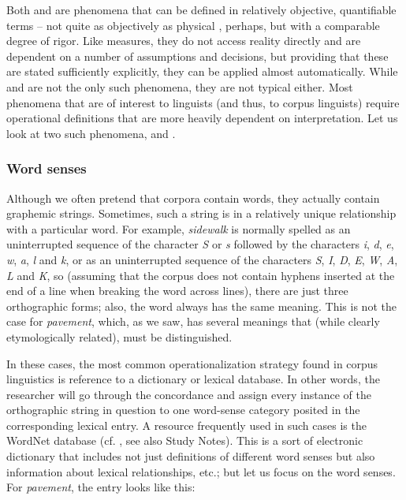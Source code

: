 Both   and  are phenomena that can be defined in relatively objective, quantifiable  terms -- not quite as objectively as physical , perhaps, but with a comparable degree of rigor. Like  measures,  they do not access reality directly and are dependent on a number of assumptions and decisions, but providing that these are stated sufficiently explicitly, they can be applied almost automatically. While   and  are not the only such phenomena, they are not typical either. Most phenomena that are of interest to linguists (and thus, to corpus linguists) require operational  definitions that are more heavily dependent on interpretation. Let us look at two such phenomena,  and  .

\subsubsection{Word senses}
\label{sec:operationalizingwordsenses}

Although we often pretend that corpora contain words, they actually contain graphemic strings. Sometimes, such a string is in a relatively unique relationship with a particular word. For example, \textit{sidewalk} is normally spelled as an uninterrupted sequence of the character \textit{S} or \textit{s} followed by the characters \textit{i}, \textit{d}, \textit{e}, \textit{w}, \textit{a}, \textit{l} and \textit{k}, or as an uninterrupted sequence of the characters \textit{S}, \textit{I}, \textit{D}, \textit{E}, \textit{W}, \textit{A}, \textit{L} and \textit{K}, so (assuming that the corpus does not contain hyphens inserted at the end of a line when breaking the word across lines), there are just three orthographic forms; also, the word always has the same meaning. This is not the case for \textit{pavement}, which, as we saw, has several meanings  that (while clearly etymologically related), must be distinguished.

In these cases, the most common operationalization  strategy found in corpus linguistics is reference to a dictionary  or lexical database. In other words, the researcher will go through the concordance  and assign every instance of the orthographic string in question to one word\hyp{}sense category posited in the corresponding lexical entry. A resource frequently used in such cases is the WordNet database (cf. \citealt{fellbaum_wordnet:_1998}, see also Study Notes). This is a sort of electronic dictionary  that includes not just definitions of different word senses but also information about lexical relationships, etc.; but let us focus on the word senses. For \textit{pavement}, the entry looks like this:


